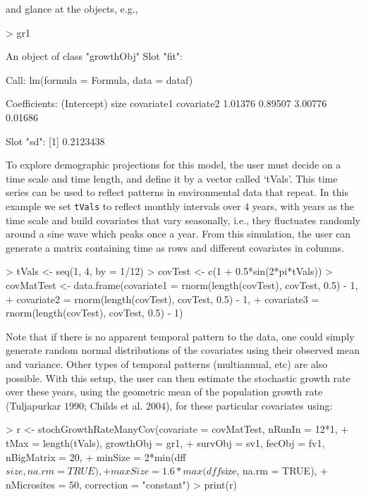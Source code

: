 \documentclass{article}
\begin{document}
and glance at the objects, e.g., 
\begin{Schunk}
\begin{Sinput}
> gr1
\end{Sinput}
\begin{Soutput}
An object of class "growthObj"
Slot "fit":

Call:
lm(formula = Formula, data = dataf)

Coefficients:
(Intercept)         size   covariate1   covariate2  
    1.01376      0.89507      3.00776      0.01686  


Slot "sd":
[1] 0.2123438
\end{Soutput}
\end{Schunk}
To explore demographic projections for this model, the user must decide on
a time scale and time length, and define it by a vector called
`tVals'.  This time series can be used to reflect patterns in environmental data
that repeat.  In this example we set {\tt tVals} to reflect monthly intervals
over $4$ years, with years as the time scale and build covariates that vary
seasonally, i.e., they fluctuates randomly around a sine wave which peaks once a
year.  From this simulation, the user can generate a matrix containing time as
rows and different covariates in columns.
\begin{Schunk}
\begin{Sinput}
> tVals <- seq(1, 4, by = 1/12)
> covTest <- c(1 + 0.5*sin(2*pi*tVals))
> covMatTest <- data.frame(covariate1 = rnorm(length(covTest), covTest, 0.5) - 1, 
+                          covariate2 = rnorm(length(covTest), covTest, 0.5) - 1, 
+                          covariate3 = rnorm(length(covTest), covTest, 0.5) - 1)
\end{Sinput}
\end{Schunk}
Note that  if there is no apparent temporal pattern to the data, one could
simply generate random normal distributions of the covariates using their observed mean and variance. Other types of temporal patterns (multiannual, etc) are also possible. With this setup, the user can then estimate the stochastic growth rate over these years, using the geometric mean of the population growth rate (Tuljapurkar $1990$; Childs et al. $2004$), for these particular covariates using:
\begin{Schunk}
\begin{Sinput}
> r <- stochGrowthRateManyCov(covariate = covMatTest, nRunIn = 12*1, 
+                             tMax = length(tVals), growthObj = gr1, 
+                             survObj = sv1, fecObj = fv1, nBigMatrix = 20, 
+                             minSize = 2*min(dff$size, na.rm = TRUE), 
+                             maxSize = 1.6*max(dff$size, na.rm = TRUE), 
+                             nMicrosites = 50, correction = "constant")
> print(r)
\end{Sinput}
\end{Schunk}
\end{document}
